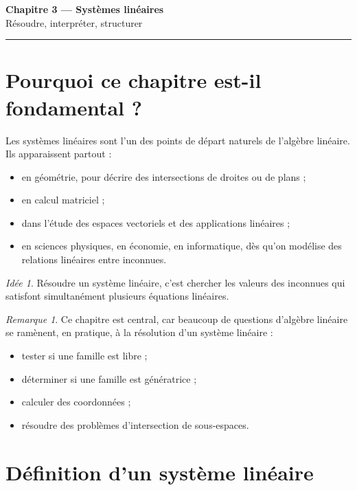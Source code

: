 \documentclass[11pt,a4paper]{article}
\theoremstyle{remark}
\newtheorem{remarque}[definition]{Remarque}
\newtheorem*{idee}{Idée}
\begin{document}
\begin{center}
    {\LARGE \textbf{Chapitre 3 --- Systèmes linéaires}}\\[0.5em]
    {\large Résoudre, interpréter, structurer}
\end{center}

\hrule
\vspace{1em}

\tableofcontents

\newpage

\section{Pourquoi ce chapitre est-il fondamental ?}

Les systèmes linéaires sont l’un des points de départ naturels de l’algèbre linéaire. Ils apparaissent partout :
\begin{itemize}
    \item en géométrie, pour décrire des intersections de droites ou de plans ;
    \item en calcul matriciel ;
    \item dans l’étude des espaces vectoriels et des applications linéaires ;
    \item en sciences physiques, en économie, en informatique, dès qu’on modélise des relations linéaires entre inconnues.
\end{itemize}

\begin{idee}
Résoudre un système linéaire, c’est chercher les valeurs des inconnues qui satisfont simultanément plusieurs équations linéaires.
\end{idee}

\begin{remarque}
Ce chapitre est central, car beaucoup de questions d’algèbre linéaire se ramènent, en pratique, à la résolution d’un système linéaire :
\begin{itemize}
    \item tester si une famille est libre ;
    \item déterminer si une famille est génératrice ;
    \item calculer des coordonnées ;
    \item résoudre des problèmes d’intersection de sous-espaces.
\end{itemize}
\end{remarque}

\section{Définition d’un système linéaire}
\end{document}
